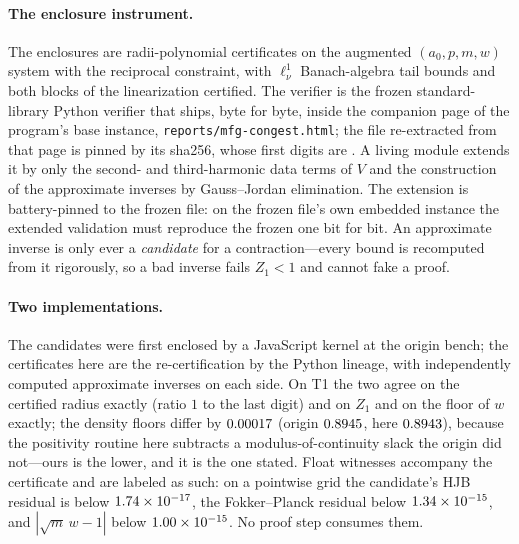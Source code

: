 \documentclass[11pt]{article}
\newcommand{\lnu}{\ell^1_\nu}
\begin{document}
\paragraph{The enclosure instrument.}
The enclosures are radii-polynomial certificates on the augmented
$(a_0,p,m,w)$ system with the reciprocal constraint, with $\lnu$
Banach-algebra tail bounds and both blocks of the linearization certified. The
verifier is the frozen standard-library Python verifier that ships, byte for
byte, inside the companion page of the program's base instance,
\texttt{reports/mfg-congest.html}; the file re-extracted from that page is
pinned by its sha256, whose first digits are \texttt{\FrozenVerifierSha}. A
living module extends it by only the second- and third-harmonic data terms of
$V$ and the construction of the approximate inverses by Gauss--Jordan
elimination. The
extension is battery-pinned to the frozen file: on the frozen file's own
embedded instance the extended validation must reproduce the frozen one bit
for bit. An approximate inverse is only ever a \emph{candidate} for a
contraction---every bound is recomputed from it rigorously, so a bad inverse
fails $Z_1<1$ and cannot fake a proof.

\paragraph{Two implementations.}
The candidates were first enclosed by a JavaScript kernel at the origin bench;
the certificates here are the re-certification by the Python lineage, with
independently computed approximate inverses on each side. On T1 the two agree
on the certified radius exactly (ratio $1$ to the last digit) and on $Z_1$ and
on the floor of $w$ exactly; the density floors differ by
$0.00017$ (origin $0.8945$, here $0.8943$),
because the positivity routine here subtracts a modulus-of-continuity slack
the origin did not---ours is the lower, and it is the one stated. Float
witnesses accompany the certificate and are labeled as such: on a pointwise
grid the candidate's HJB residual is below $1.74\times10^{-17}$, the Fokker--Planck
residual below $1.34\times10^{-15}$, and $|\sqrt m\,w-1|$ below $1.00\times10^{-15}$. No
proof step consumes them.
\end{document}
